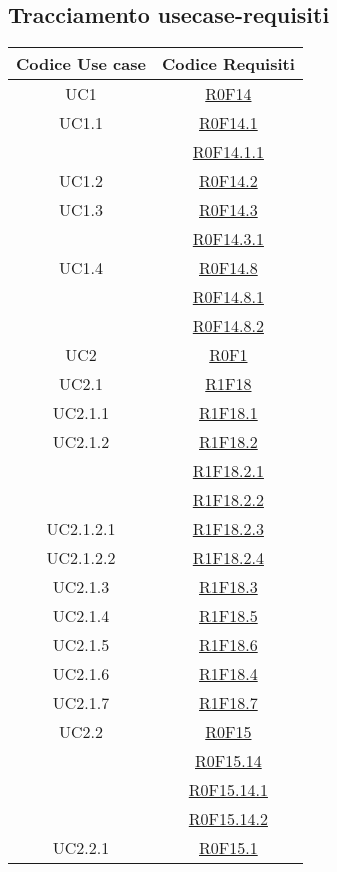 \documentclass[../AnalisiDeiRequisiti.tex]{subfiles}
\begin{document}
\subsection{Tracciamento usecase-requisiti}
\normalsize
\begin{longtable}{|c|c|}
	\hline
	\textbf{Codice Use case} & \textbf{Codice Requisiti} \\
	\hline
	\endhead
	UC1 & \hyperlink{R0F14}{R0F14}\\\hline
	UC1.1 & \hyperlink{R0F14.1}{R0F14.1}\\& \hyperlink{R0F14.1.1}{R0F14.1.1}\\\hline
	UC1.2 & \hyperlink{R0F14.2}{R0F14.2}\\\hline
	UC1.3 & \hyperlink{R0F14.3}{R0F14.3}\\& \hyperlink{R0F14.3.1}{R0F14.3.1}\\\hline
	UC1.4 & \hyperlink{R0F14.8}{R0F14.8}\\& \hyperlink{R0F14.8.1}{R0F14.8.1}\\& \hyperlink{R0F14.8.2}{R0F14.8.2}\\\hline
	UC2 & \hyperlink{R0F1}{R0F1}\\\hline
	UC2.1 & \hyperlink{R1F18}{R1F18}\\\hline
	UC2.1.1 & \hyperlink{R1F18.1}{R1F18.1}\\\hline
	UC2.1.2 & \hyperlink{R1F18.2}{R1F18.2}\\& \hyperlink{R1F18.2.1}{R1F18.2.1}\\& \hyperlink{R1F18.2.2}{R1F18.2.2}\\\hline
	UC2.1.2.1 & \hyperlink{R1F18.2.3}{R1F18.2.3}\\\hline
	UC2.1.2.2 & \hyperlink{R1F18.2.4}{R1F18.2.4}\\\hline
	UC2.1.3 & \hyperlink{R1F18.3}{R1F18.3}\\\hline
	UC2.1.4 & \hyperlink{R1F18.5}{R1F18.5}\\\hline
	UC2.1.5 & \hyperlink{R1F18.6}{R1F18.6}\\\hline
	UC2.1.6 & \hyperlink{R1F18.4}{R1F18.4}\\\hline
	UC2.1.7 & \hyperlink{R1F18.7}{R1F18.7}\\\hline
	UC2.2 & \hyperlink{R0F15}{R0F15}\\& \hyperlink{R0F15.14}{R0F15.14}\\& \hyperlink{R0F15.14.1}{R0F15.14.1}\\& \hyperlink{R0F15.14.2}{R0F15.14.2}\\\hline
	UC2.2.1 & \hyperlink{R0F15.1}{R0F15.1}\\\hline

\end{longtable}
\end{document}
